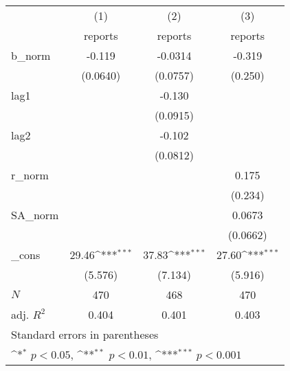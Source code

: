 {
\def\sym#1{\ifmmode^{#1}\else\(^{#1}\)\fi}
\begin{tabular}{l*{3}{c}}
\hline\hline
            &\multicolumn{1}{c}{(1)}&\multicolumn{1}{c}{(2)}&\multicolumn{1}{c}{(3)}\\
            &\multicolumn{1}{c}{reports}&\multicolumn{1}{c}{reports}&\multicolumn{1}{c}{reports}\\
\hline
b\_norm      &      -0.119         &     -0.0314         &      -0.319         \\
            &    (0.0640)         &    (0.0757)         &     (0.250)         \\
[1em]
lag1        &                     &      -0.130         &                     \\
            &                     &    (0.0915)         &                     \\
[1em]
lag2        &                     &      -0.102         &                     \\
            &                     &    (0.0812)         &                     \\
[1em]
r\_norm      &                     &                     &       0.175         \\
            &                     &                     &     (0.234)         \\
[1em]
SA\_norm     &                     &                     &      0.0673         \\
            &                     &                     &    (0.0662)         \\
[1em]
\_cons      &       29.46\sym{***}&       37.83\sym{***}&       27.60\sym{***}\\
            &     (5.576)         &     (7.134)         &     (5.916)         \\
\hline
\(N\)       &         470         &         468         &         470         \\
adj. \(R^{2}\)&       0.404         &       0.401         &       0.403         \\
\hline\hline
\multicolumn{4}{l}{\footnotesize Standard errors in parentheses}\\
\multicolumn{4}{l}{\footnotesize \sym{*} \(p<0.05\), \sym{**} \(p<0.01\), \sym{***} \(p<0.001\)}\\
\end{tabular}
}
